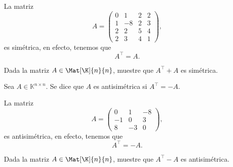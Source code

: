 \documentclass[compacto,10pt]{pubciencias-notas}
\begin{document}
\begin{ejem}\hspace{0pt} La matriz 
\[
A = \begin{pmatrix}0&1&2&2\\1&-8&2&3\\2&2&5&4\\2&3&4&1
\end{pmatrix},
\]
es simétrica, en efecto, tenemos que
\[
    A^{\intercal} = A.
\]
\end{ejem}

\begin{ejer}\hspace{0pt} Dada la matriz $A\in\Mat[\K]{n}{n}$, muestre que $A^{\intercal} + A$ es simétrica.
\end{ejer}

\begin{defi}
    Sea $A\in \mathbb{K}^{n \times n}$. Se dice que $A$ es antisimétrica si $A^\intercal = -A$.
\end{defi}

\begin{ejem}\hspace{0pt} La matriz
\[
A = \begin{pmatrix}0&1&-8\\-1&0&3\\8&-3&0\end{pmatrix},
\]
es antisimétrica, en efecto, tenemos que
\[
    A^{\intercal} = - A.
\]
\end{ejem}

\begin{ejer}\hspace{0pt} Dada la matriz $A\in\Mat[\K]{n}{n}$, muestre que $A^{\intercal} - A$ es antisimétrica.
\end{ejer}
\end{document}
